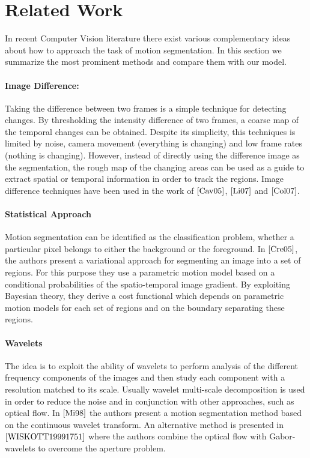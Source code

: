 \section{Related Work}
In recent Computer Vision literature there exist various complementary ideas about how to approach the task of motion segmentation. In this section we summarize the most prominent methods and compare them with our model.

\paragraph{Image Difference:} Taking the difference between two frames is a simple technique for detecting changes. By thresholding the intensity difference of two frames, a coarse map of the temporal changes can be obtained. Despite its simplicity, this techniques is limited by noise, camera movement (everything is changing) and low frame rates (nothing is changing). However, instead of directly using the difference image as the segmentation, the rough map of the changing areas can be used as a guide to extract spatial or temporal information in order to track the regions. Image difference techniques have been used in the work of $\cite{Cav05}$, $\cite{Li07}$ and $\cite{Col07}$.

\paragraph{Statistical Approach} Motion segmentation can be identified as the classification problem, whether a particular pixel belongs to either the background or the foreground. In $\cite{Cre05}$, the authors present a variational approach for segmenting an image into a set of regions. For this purpose they use a parametric motion model based on a conditional probabilities of the spatio-temporal image gradient. By exploiting Bayesian theory, they derive a cost functional which depends on parametric motion models for each set of regions and on the boundary separating these regions.

\paragraph{Wavelets}
The idea is to exploit the ability of wavelets to perform analysis of the different frequency components of the images and then study each component with a resolution matched to its scale. Usually wavelet multi-scale decomposition is used in order to reduce the noise and in conjunction with other approaches, such as optical flow. In $\cite{Mi98}$ the authors present a motion segmentation method based on the continuous wavelet transform. An alternative method is presented in $\cite{WISKOTT19991751}$ where the authors combine the optical flow with Gabor-wavelets to overcome the aperture problem. 

